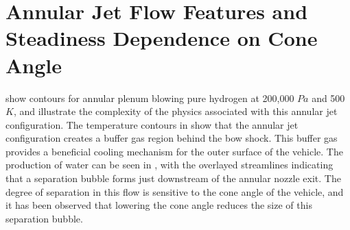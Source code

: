 \section{Annular Jet Flow Features and Steadiness Dependence on Cone Angle}

 show contours for
annular plenum blowing pure hydrogen at 200,000 $Pa$ and 500$K$, and illustrate the
complexity of the physics associated with this annular jet configuration.  The
temperature contours in  show that the annular
jet configuration creates a buffer gas region behind the bow shock.  This buffer
gas provides a beneficial cooling mechanism for the outer surface of the
vehicle.  The production of water can be seen in ,
with the overlayed streamlines indicating that a separation bubble forms just
downstream of the annular nozzle exit.  The degree of separation in this flow is
sensitive to the cone angle of the vehicle, and it has been observed that
lowering the cone angle reduces the size of this separation bubble.
